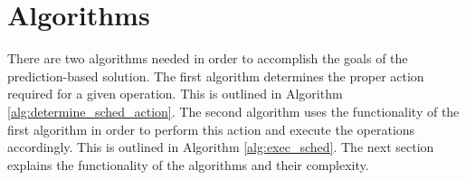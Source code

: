 \section{Algorithms}
\label{pbs:algorithms}
There are two algorithms needed in order to accomplish the goals of the prediction-based solution. The first algorithm determines the proper action required for a given operation. This is outlined in Algorithm \ref{alg:determine_sched_action}. The second algorithm uses the functionality of the first algorithm in order to perform this action and execute the operations accordingly. This is outlined in Algorithm \ref{alg:exec_sched}. The next section explains the functionality of the algorithms and their complexity.